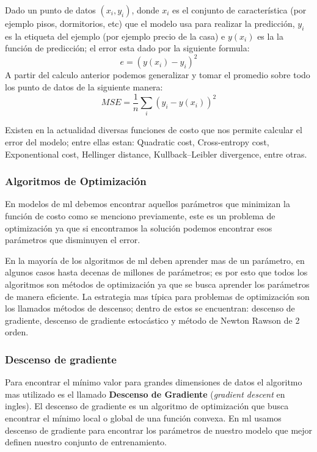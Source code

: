 Dado un punto de datos $(x_i,y_i) $, donde $x_i $ es el conjunto de característica (por ejemplo pisos, dormitorios, etc) que el modelo usa para realizar la predicción, $y_i $ es la etiqueta del ejemplo (por ejemplo precio de la casa) e $y(x_i)$ es la la función de predicción; el error esta dado por la siguiente formula:
\begin{equation}\label{eqn:error-mse}
e = (y(x_i) - y_i)^2
\end{equation} 
A partir del calculo anterior podemos generalizar y tomar el promedio sobre todo los punto de datos de la siguiente manera:
\begin{equation}
MSE =  \frac{1}{n}\sum_{i}(y_i - y(x_i))^2
\end{equation}

Existen en la actualidad diversas funciones de costo que nos permite calcular el error del modelo; entre ellas estan: Quadratic cost, Cross-entropy cost, Exponentional cost, Hellinger distance, Kullback–Leibler divergence, entre otras.


\subsubsection{Algoritmos de Optimización} 
En modelos de \ac{ml} debemos encontrar aquellos parámetros que minimizan la función de costo como se menciono previamente, este es un problema de optimización ya que si encontramos la solución podemos encontrar esos parámetros que disminuyen el error.

En la mayoría de los algoritmos de \ac{ml} deben aprender mas de un parámetro, en algunos casos hasta decenas de millones de parámetros; es por esto que todos los algoritmos  son métodos de optimización ya que se busca aprender los parámetros de manera eficiente. La estrategia mas típica para problemas de optimización son los llamados métodos de descenso; dentro de estos se encuentran: descenso de gradiente, descenso de gradiente estocástico y método de Newton Rawson de 2 orden.

\subsubsection*{Descenso de gradiente}\label{sub:gradient-desc}
Para encontrar el mínimo valor para grandes dimensiones de datos el algoritmo mas utilizado es el llamado \textbf{Descenso de Gradiente} (\textit{gradient descent} en ingles). El descenso de gradiente es un algoritmo de optimización que busca encontrar el mínimo local o global de una función convexa.  En \ac{ml} usamos descenso de gradiente para encontrar los parámetros de nuestro modelo que mejor definen nuestro conjunto de entrenamiento.

